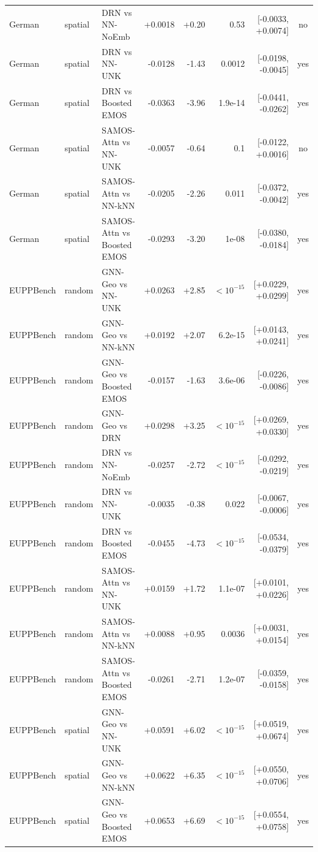 \begin{table}[!htbp]
\begin{tabular}{lllrrrrc}
German & spatial & DRN vs NN-NoEmb & +0.0018 & +0.20 & 0.53 & [-0.0033, +0.0074] & no \\
German & spatial & DRN vs NN-UNK & -0.0128 & -1.43 & 0.0012 & [-0.0198, -0.0045] & yes \\
German & spatial & DRN vs Boosted EMOS & -0.0363 & -3.96 & 1.9e-14 & [-0.0441, -0.0262] & yes \\
German & spatial & SAMOS-Attn vs NN-UNK & -0.0057 & -0.64 & 0.1 & [-0.0122, +0.0016] & no \\
German & spatial & SAMOS-Attn vs NN-kNN & -0.0205 & -2.26 & 0.011 & [-0.0372, -0.0042] & yes \\
German & spatial & SAMOS-Attn vs Boosted EMOS & -0.0293 & -3.20 & 1e-08 & [-0.0380, -0.0184] & yes \\
\addlinespace
EUPPBench & random & GNN-Geo vs NN-UNK & +0.0263 & +2.85 & $<10^{-15}$ & [+0.0229, +0.0299] & yes \\
EUPPBench & random & GNN-Geo vs NN-kNN & +0.0192 & +2.07 & 6.2e-15 & [+0.0143, +0.0241] & yes \\
EUPPBench & random & GNN-Geo vs Boosted EMOS & -0.0157 & -1.63 & 3.6e-06 & [-0.0226, -0.0086] & yes \\
EUPPBench & random & GNN-Geo vs DRN & +0.0298 & +3.25 & $<10^{-15}$ & [+0.0269, +0.0330] & yes \\
EUPPBench & random & DRN vs NN-NoEmb & -0.0257 & -2.72 & $<10^{-15}$ & [-0.0292, -0.0219] & yes \\
EUPPBench & random & DRN vs NN-UNK & -0.0035 & -0.38 & 0.022 & [-0.0067, -0.0006] & yes \\
EUPPBench & random & DRN vs Boosted EMOS & -0.0455 & -4.73 & $<10^{-15}$ & [-0.0534, -0.0379] & yes \\
EUPPBench & random & SAMOS-Attn vs NN-UNK & +0.0159 & +1.72 & 1.1e-07 & [+0.0101, +0.0226] & yes \\
EUPPBench & random & SAMOS-Attn vs NN-kNN & +0.0088 & +0.95 & 0.0036 & [+0.0031, +0.0154] & yes \\
EUPPBench & random & SAMOS-Attn vs Boosted EMOS & -0.0261 & -2.71 & 1.2e-07 & [-0.0359, -0.0158] & yes \\
\addlinespace
EUPPBench & spatial & GNN-Geo vs NN-UNK & +0.0591 & +6.02 & $<10^{-15}$ & [+0.0519, +0.0674] & yes \\
EUPPBench & spatial & GNN-Geo vs NN-kNN & +0.0622 & +6.35 & $<10^{-15}$ & [+0.0550, +0.0706] & yes \\
EUPPBench & spatial & GNN-Geo vs Boosted EMOS & +0.0653 & +6.69 & $<10^{-15}$ & [+0.0554, +0.0758] & yes \\

\end{tabular}
\end{table}
